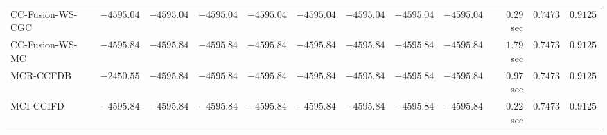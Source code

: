 \begin{table}[H]
\begin{tabular}{lrrrrrrrrrrr}
    CC-Fusion-WS-CGC & $     -4595.04$ & $     -4595.04$ & $     -4595.04$ & $     -4595.04$ & $     -4595.04$ & $     -4595.04$ & $     -4595.04$ & $     -4595.04$ & $         0.29$ sec    & $       0.7473$  & $       0.9125$ \\ 
     CC-Fusion-WS-MC & $     -4595.84$ & $     -4595.84$ & $     -4595.84$ & $     -4595.84$ & $     -4595.84$ & $     -4595.84$ & $     -4595.84$ & $     -4595.84$ & $         1.79$ sec    & $       0.7473$  & $       0.9125$ \\ 
\cmidrule{1-1} 
           MCR-CCFDB & $     -2450.55$ & $     -4595.84$ & $     -4595.84$ & $     -4595.84$ & $     -4595.84$ & $     -4595.84$ & $     -4595.84$ & $     -4595.84$ & $         0.97$ sec    & $       0.7473$  & $       0.9125$ \\ 
\cmidrule{1-1} 
           MCI-CCIFD & $     -4595.84$ & $     -4595.84$ & $     -4595.84$ & $     -4595.84$ & $     -4595.84$ & $     -4595.84$ & $     -4595.84$ & $     -4595.84$ & $         0.22$ sec    & $       0.7473$  & $       0.9125$ \\ 
\bottomrule
\end{tabular}
\end{table}

